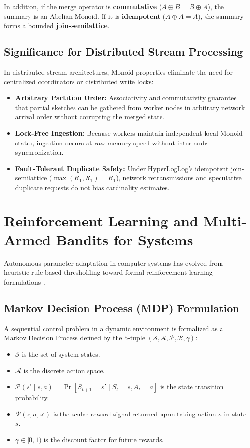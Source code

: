 In addition, if the merge operator is \textbf{commutative} ($A \oplus B = B \oplus A$), the summary is an Abelian Monoid. If it is \textbf{idempotent} ($A \oplus A = A$), the summary forms a bounded \textbf{join-semilattice}.

\subsection{Significance for Distributed Stream Processing}
In distributed stream architectures, Monoid properties eliminate the need for centralized coordinators or distributed write locks:
\begin{itemize}
 \item \textbf{Arbitrary Partition Order:} Associativity and commutativity guarantee that partial sketches can be gathered from worker nodes in arbitrary network arrival order without corrupting the merged state.
 \item \textbf{Lock-Free Ingestion:} Because workers maintain independent local Monoid states, ingestion occurs at raw memory speed without inter-node synchronization.
 \item \textbf{Fault-Tolerant Duplicate Safety:} Under HyperLogLog's idempotent join-semilattice ($\max(R_1, R_1) = R_1$), network retransmissions and speculative duplicate requests do not bias cardinality estimates.
\end{itemize}

\section{Reinforcement Learning and Multi-Armed Bandits for Systems}

Autonomous parameter adaptation in computer systems has evolved from heuristic rule-based thresholding toward formal reinforcement learning formulations~\cite{sutton2018reinforcement}.

\subsection{Markov Decision Process (MDP) Formulation}
A sequential control problem in a dynamic environment is formalized as a Markov Decision Process defined by the 5-tuple $(\mathcal{S}, \mathcal{A}, \mathcal{P}, \mathcal{R}, \gamma)$:
\begin{itemize}
 \item $\mathcal{S}$ is the set of system states.
 \item $\mathcal{A}$ is the discrete action space.
 \item $\mathcal{P}(s' \mid s, a) = \Pr[S_{t+1} = s' \mid S_t = s, A_t = a]$ is the state transition probability.
 \item $\mathcal{R}(s, a, s')$ is the scalar reward signal returned upon taking action $a$ in state $s$.
 \item $\gamma \in [0, 1)$ is the discount factor for future rewards.
\end{itemize}

